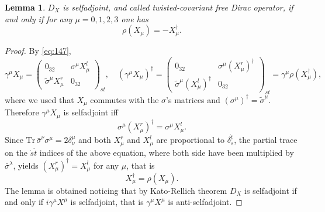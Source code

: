 \documentclass[11pt]{article}
\newcommand{\sI}{\mathrm  I}
\newcommand{\sJ}{\mathrm J}
\newtheorem{lemma}[prop]{Lemma}
\begin{document}
\begin{lemma} 
\label{lemma-selfadjoint}
$D_X$ is selfadjoint, and called twisted-covariant free Dirac
operator,  if and only if for
  any $\mu= 0, 1,2,3$ one has
  \begin{equation}
 \rho( X_\mu) = - X_\mu^\dagger.
\label{eq:150}
  \end{equation}
\end{lemma}
\begin{proof}
By \eqref{eq:147},
\begin{equation}
  \label{eq:149}
 \gamma^\mu X_\mu = 
  \left(\begin{array}{cc} 0_{32}  & \sigma^\mu X_\mu^l \\
\tilde \sigma^\mu X_\mu^r & 0_{32}\end{array}\right)_{st} ,\quad 
 (\gamma^\mu X_\mu )^\dagger=  
  \left(\begin{array}{cc} 0_{32}  & \sigma^\mu (X_\mu^r)^\dagger \\
\tilde \sigma^\mu (X_\mu^l)^\dagger& 0_{32}\end{array}\right)_{st} = \gamma^\mu\rho(X_\mu^\dagger),
\end{equation}
where we used that $X_\mu$ commutes with the $\sigma$'s matrices and
$(\sigma^\mu)^\dagger = \tilde \sigma^\mu$. Therefore $\gamma^\mu X_\mu$ is selfadjoint iff 
\begin{equation}
  \label{eq:151}
  \sigma^\mu (X_\mu^r)^\dagger = \sigma^\mu X_\mu^l.
\end{equation}
Since $\text{Tr}\, \bar\sigma^\nu\sigma^\mu = 2\delta^\mu_\nu$ and both $X_\mu^r$ and $X_\mu^l$ are proportional to
$\delta_{\dot s}^{\dot t}$,  the partial trace  on the $\dot s\dot t$
indices of the above equation, where both side have been multiplied by
$\bar\sigma^\lambda$, yields 
$ (X_\mu^r)^\dagger = X_\mu^l$ for any $\mu$, that is
\begin{equation}
  X_\mu^\dagger = \rho(X_\mu).
\end{equation}
The lemma is obtained noticing that by Kato-Rellich theorem $D_X$ is
selfadjoint if and only if $i\gamma^\mu X^\mu$ is selfadjoint, that is
$\gamma^\mu X^\mu$ is
anti-selfadjoint. 
\end{proof}
\end{document}
